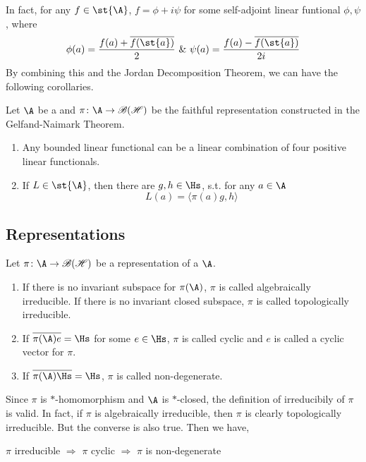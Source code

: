 In fact, for any $f \in \st{\A}$, $f = \phi + i \psi$ for some self-adjoint linear funtional $\phi, \psi$, where
\begin{equation*}
	\phi(a) = \frac{f(a) + \clo{f(\st{a})}}{2} ~\&~ \psi(a) =\frac{f(a) - \clo{f(\st{a})}}{2i}
\end{equation*}
By combining this and the Jordan Decomposition Theorem, we can have the following corollaries.

\begin{cor}
	Let $\A$ be a \Cs and $\pi \colon \A \sto \oper$ be the faithful representation constructed in the Gelfand-Naimark Theorem.
	\begin{enumerate}[label=\arabic*)]
		\item Any bounded linear functional can be a linear combination of four positive linear functionals.
		\item If $L \in \st{\A}$, then there are $g,h \in \Hs$, s.t. for any $a \in \A$
		\begin{equation*}
			L(a) = \langle \pi(a)g,h \rangle
		\end{equation*}
	\end{enumerate}
\end{cor}

\subsection{Representations}

\begin{defn}
	Let $\pi \colon \A \sto \oper$ be a representation of a \Cs $\A$.
	\begin{enumerate}[label=\arabic*)]
		\item If there is no invariant subspace for $\pi(\A)$, $\pi$ is called algebraically irreducible. If there is no invariant closed subspace, $\pi$ is called topologically irreducible.
		\item If $\clo{\pi(\A)e} = \Hs$ for some $e \in \Hs$, $\pi$ is called cyclic and $e$ is called a cyclic vector for $\pi$.
		\item If $\clo{\pi(\A)\Hs} = \Hs$, $\pi$ is called non-degenerate.
	\end{enumerate}
\end{defn}
\begin{rem}
	Since $\pi$ is $*$-homomorphism and $\A$ is $*$-closed, the definition of irreducibily of $\pi$ is valid. In fact, if $\pi$ is algebraically irreducible, then $\pi$ is clearly topologically irreducible. But the converse is also true. Then we have,
	\begin{center}
		$\pi$ irreducible $\Rightarrow$ $\pi$ cyclic $\Rightarrow$ $\pi$ is non-degenerate
	\end{center}
\end{rem}

